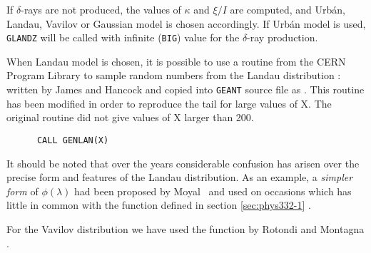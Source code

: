 If $\delta$-rays are not produced, the
values of $\kappa$ and $\xi /I$ are computed,
and Urb\'an, Landau, Vavilov or Gaussian model
is chosen accordingly.
If Urb\'an model is used, {\tt GLANDZ} will be
called with infinite ({\tt BIG}) value for
the $\delta$-ray production.

When Landau model is chosen, it is possible to use a routine from 
the CERN Program Library to sample
random numbers from the Landau distribution :
 written by James and Hancock \cite{bib-JAME} and copied 
into {\tt GEANT} source file as . This routine has been modified
in order to reproduce the tail for large values of X. The original routine
did not give values of X larger than 200.
\begin{verbatim}
      CALL GENLAN(X)
\end{verbatim}
It should be noted that over the years considerable confusion has
arisen over the precise form and features of the Landau distribution.
As an example, a {\it simpler form} of $\phi(\lambda)$ had been
proposed by Moyal~\cite{bib-MOYA} and
used on occasions which has little in common with
the function defined in section \ref{sec:phys332-1} \cite{bib-KOL2}.

For the Vavilov distribution we have used the function 
by Rotondi and Montagna \cite{bib-ROTO}. 
